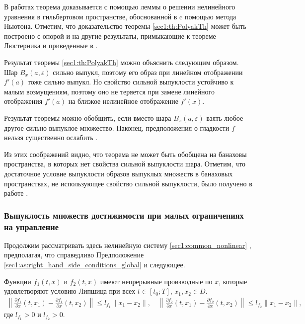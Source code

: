 \documentclass[../main.tex]{subfiles}
\begin{document}
В работах \cite{Polyak2001, Polyak2001ru} теорема доказывается с помощью леммы о решении нелинейного уравнения в гильбертовом пространстве, обоснованной в \cite{Polyak1964} c помощью метода Ньютона.
Отметим, что доказательство теоремы \ref{sec1:th:PolyakTh} может быть построено с опорой и на другие результаты, примыкающие к теореме Люстерника и приведенные в \cite{Dmitruk1980, Ioffe}.
    
Результат теоремы \ref{sec1:th:PolyakTh} можно объяснить следующим образом.
Шар $B_x(a,\varepsilon)$ сильно выпукл, поэтому его образ при линейном отображении $f'(a)$ тоже сильно выпукл.
Но свойство сильной выпуклости устойчиво к малым возмущениям, поэтому оно не теряется при замене линейного отображения $f'(a)$ на близкое нелинейное отображение $f'(x)$. 
    
Результат теоремы можно обобщить, если вместо шара $B_x(a,\varepsilon) $ взять любое другое сильно выпуклое множество.
Наконец, предположения о гладкости $f$ нельзя существенно ослабить \cite{Polyak2001, Polyak2001ru}.
    
Из этих соображений видно, что теорема не может быть обобщена на банаховы пространства, в которых нет свойства сильной выпуклости шара.
Отметим, что достаточное условие выпуклости  образов выпуклых множеств в банаховых пространствах, не использующее свойство сильной выпуклости, было получено в работе \cite{Ledyaev}. 
    
\subsubsection{Выпуклость множеств достижимости при малых ограничениях на управление}
    
Продолжим рассматривать здесь нелинейную систему \eqref{sec1:common_nonlinear} , предполагая, что справедливо Предположение \ref{sec1:as:right_hand_side_conditions_global} и следующее.
\begin{assumption}\label{sec1:as:right_hand_side_diff_lip}
    Функции $f_1(t,x)$ и $f_2(t,x)$ имеют непрерывные производные по $x$, которые удовлетворяют условию Липшица при всех $t \in [t_0;T]$, $x_1, x_2 \in D$.
    \begin{gather*}
        \left\| \frac{\partial f_1}{\partial x}(t,x_1) - \frac{\partial f_1}{\partial x}(t,x_2) \right\| \leqslant l_{f_1} \| x_1 - x_2\|, \quad \left\| \frac{\partial f_2}{\partial x}(t,x_1) - \frac{\partial f_2}{\partial x}(t,x_2) \right\| \leqslant l_{f_2} \| x_1 - x_2\|,
    \end{gather*}
    где $l_{f_1} > 0$ и $l_{f_2} > 0$.
\end{assumption}
    
\end{document}
